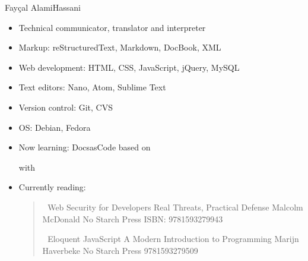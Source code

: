 \documentclass[a4paper,10pt,english,openany,oneside]{sphinxmanual}
\begin{document}
\sphinxAtStartPar
Fayçal Alami\sphinxhyphen{}Hassani \sphinxhyphen{} %
\begin{footnote}[1]\sphinxAtStartFootnote
{}
%
\end{footnote} \sphinxhyphen{} %
\begin{footnote}[2]\sphinxAtStartFootnote
{}
%
\end{footnote}
\begin{itemize}
\item {} 
\sphinxAtStartPar
Technical communicator, translator and interpreter

\item {} 
\sphinxAtStartPar
Markup: reStructuredText, Markdown, DocBook, XML

\item {} 
\sphinxAtStartPar
Web development: HTML, CSS, JavaScript, jQuery, MySQL

\item {} 
\sphinxAtStartPar
Text editors: Nano, Atom, Sublime Text

\item {} 
\sphinxAtStartPar
Version control: Git, CVS

\item {} 
\sphinxAtStartPar
OS: Debian, Fedora

\item {} 
\sphinxAtStartPar
Now learning: Docs\sphinxhyphen{}as\sphinxhyphen{}Code based on %
\begin{footnote}[3]\sphinxAtStartFootnote
{}
%
\end{footnote} with %
\begin{footnote}[4]\sphinxAtStartFootnote
{}
%
\end{footnote}

\item {} 
\sphinxAtStartPar
Currently reading:
\begin{quote}

\sphinxAtStartPar
📕 Web Security for Developers \sphinxhyphen{} Real Threats, Practical Defense \sphinxhyphen{} Malcolm McDonald \sphinxhyphen{} No Starch Press \sphinxhyphen{} ISBN: 978\sphinxhyphen{}1\sphinxhyphen{}59327\sphinxhyphen{}994\sphinxhyphen{}3

\sphinxAtStartPar
📕 Eloquent JavaScript \sphinxhyphen{} A Modern Introduction to Programming \sphinxhyphen{} Marijn Haverbeke \sphinxhyphen{} No Starch Press \sphinxhyphen{} 978\sphinxhyphen{}1\sphinxhyphen{}59327950\sphinxhyphen{}9
\end{quote}

\end{itemize}
\end{document}
